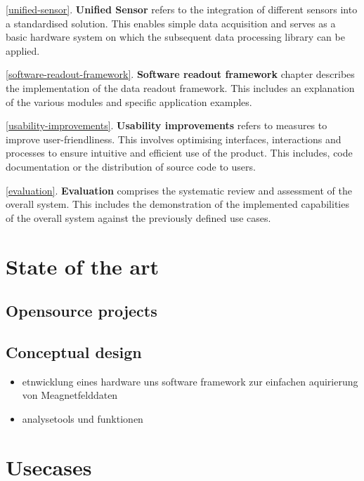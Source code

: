 \ref{unified-sensor}. \textbf{Unified Sensor} refers to the integration
of different sensors into a standardised solution. This enables simple
data acquisition and serves as a basic hardware system on which the
subsequent data processing library can be applied.

\ref{software-readout-framework}. \textbf{Software readout framework}
chapter describes the implementation of the data readout framework. This
includes an explanation of the various modules and specific application
examples.

\ref{usability-improvements}. \textbf{Usability improvements} refers to
measures to improve user-friendliness. This involves optimising
interfaces, interactions and processes to ensure intuitive and efficient
use of the product. This includes, code documentation or the
distribution of source code to users.

\ref{evaluation}. \textbf{Evaluation} comprises the systematic review
and assessment of the overall system. This includes the demonstration of
the implemented capabilities of the overall system against the
previously defined use cases.

\hypertarget{state-of-the-art}{%
\chapter{State of the art}\label{state-of-the-art}}

\hypertarget{opensource-projects}{%
\section{Opensource projects}\label{opensource-projects}}

\hypertarget{conceptual-design}{%
\section{Conceptual design}\label{conceptual-design}}

\begin{itemize}
\tightlist
\item
  etnwicklung eines hardware uns software framework zur einfachen
  aquirierung von Meagnetfelddaten
\item
  analysetools und funktionen
\end{itemize}

\hypertarget{usecases}{%
\chapter{Usecases}\label{usecases}}


